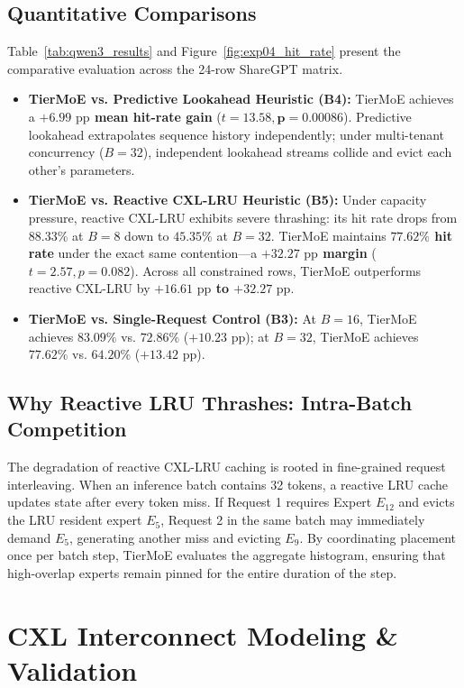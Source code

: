 \documentclass[10pt,journal,compsoc]{IEEEtran}
\begin{document}
\subsection{Quantitative Comparisons}
Table~\ref{tab:qwen3_results} and Figure~\ref{fig:exp04_hit_rate} present the comparative evaluation across the 24-row ShareGPT matrix.
\begin{itemize}
    \item \textbf{TierMoE vs. Predictive Lookahead Heuristic (B4):} TierMoE achieves a \textbf{$+6.99\text{ pp}$ mean hit-rate gain} ($t = 13.58, \mathbf{p = 0.00086}$). Predictive lookahead extrapolates sequence history independently; under multi-tenant concurrency ($B=32$), independent lookahead streams collide and evict each other's parameters.
    \item \textbf{TierMoE vs. Reactive CXL-LRU Heuristic (B5):} Under capacity pressure, reactive CXL-LRU exhibits severe thrashing: its hit rate drops from $88.33\%$ at $B=8$ down to \textbf{$45.35\%$} at $B=32$. TierMoE maintains \textbf{$77.62\%$ hit rate} under the exact same contention---a \textbf{$+32.27\text{ pp}$ margin} ($t = 2.57, p = 0.082$). Across all constrained rows, TierMoE outperforms reactive CXL-LRU by \textbf{$+16.61\text{ pp}$ to $+32.27\text{ pp}$}.
    \item \textbf{TierMoE vs. Single-Request Control (B3):} At $B=16$, TierMoE achieves $83.09\%$ vs. $72.86\%$ ($+10.23\text{ pp}$); at $B=32$, TierMoE achieves $77.62\%$ vs. $64.20\%$ ($+13.42\text{ pp}$).
\end{itemize}

\subsection{Why Reactive LRU Thrashes: Intra-Batch Competition}
The degradation of reactive CXL-LRU caching is rooted in fine-grained request interleaving. When an inference batch contains 32 tokens, a reactive LRU cache updates state after every token miss. If Request 1 requires Expert $E_{12}$ and evicts the LRU resident expert $E_5$, Request 2 in the same batch may immediately demand $E_5$, generating another miss and evicting $E_9$. By coordinating placement once per batch step, TierMoE evaluates the aggregate histogram, ensuring that high-overlap experts remain pinned for the entire duration of the step.

\section{CXL Interconnect Modeling \& Validation}
\label{sec:cxl_model}
\end{document}
